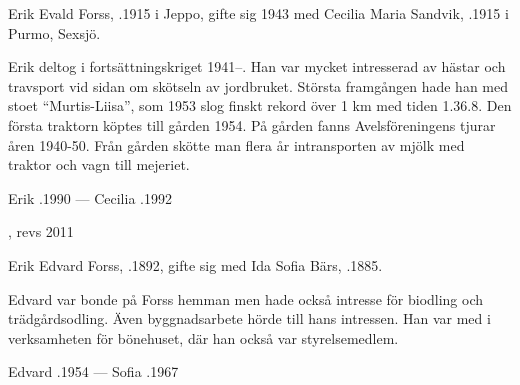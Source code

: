 Erik Evald Forss, .1915 i Jeppo, gifte sig 1943 med Cecilia Maria Sandvik, .1915 i Purmo, Sexsjö.
\begin{jhchildren}
  \item {}
  \item {}
  \item {}
  \item {}
\end{jhchildren}

Erik deltog i fortsättningskriget 1941--. Han var mycket intresserad av hästar och travsport vid sidan om skötseln av jordbruket. Största framgången hade han med  stoet ``Murtis-Liisa'', som 1953 slog finskt rekord över 1 km med tiden 1.36.8. Den första traktorn köptes till gården 1954. På gården fanns Avelsföreningens tjurar åren 1940-50. Från gården skötte man flera år intransporten av mjölk med traktor och vagn till mejeriet.

Erik .1990  ---  Cecilia .1992


, revs 2011



Erik Edvard Forss, .1892, gifte sig med Ida Sofia Bärs, .1885.
\begin{jhchildren}
  \item {}
  \item {}
  \item {}
\end{jhchildren}
Edvard var bonde på Forss hemman men hade också intresse för biodling och trädgårdsodling. Även byggnadsarbete hörde till hans intressen. Han var med i verksamheten för bönehuset, där han också var styrelsemedlem.

Edvard .1954  ---  Sofia .1967


